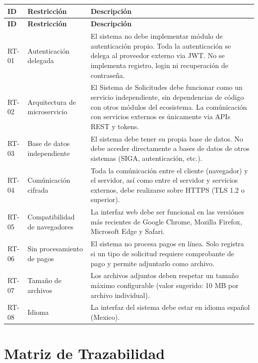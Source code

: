 \begin{longtable}{|C{1cm}|L{4cm}|L{8.5cm}|}
    \hline
    \textbf{ID} & \textbf{Restricción} & \textbf{Descripción} \\
    \hline
    \endfirsthead
    \hline
    \textbf{ID} & \textbf{Restricción} & \textbf{Descripción} \\
    \hline
    \endhead
    \hline
    \endfoot

    RT-01 & Autenticación delegada & El sistema no debe implementar módulo de autenticación propio. Toda la autenticación se delega al proveedor externo via JWT. No se implementa registro, login ni recuperación de contraseña. \\
    \hline
    RT-02 & Arquitectura de microservicio & El Sistema de Solicitudes debe funcionar como un servicio independiente, sin dependencias de código con otros módulos del ecosistema. La comúnicación con servicios externos es únicamente via APIs REST y tokens. \\
    \hline
    RT-03 & Base de datos independiente & El sistema debe tener su propia base de datos. No debe acceder directamente a bases de datos de otros sistemas (SIGA, autenticación, etc.). \\
    \hline
    RT-04 & Comúnicación cifrada & Toda la comúnicación entre el cliente (navegador) y el servidor, así como entre el servidor y servicios externos, debe realizarse sobre HTTPS (TLS 1.2 o superior). \\
    \hline
    RT-05 & Compatibilidad de navegadores & La interfaz web debe ser funcional en las versiónes más recientes de Google Chrome, Mozilla Firefox, Microsoft Edge y Safari. \\
    \hline
    RT-06 & Sin procesamiento de pagos & El sistema no procesa pagos en línea. Solo registra si un tipo de solicitud requiere comprobante de pago y permite adjuntarlo como archivo. \\
    \hline
    RT-07 & Tamaño de archivos & Los archivos adjuntos deben respetar un tamaño máximo configurable (valor sugerido: 10 MB por archivo individual). \\
    \hline
    RT-08 & Idioma & La interfaz del sistema debe estar en idioma español (Mexico). \\
    \hline
\end{longtable}

\section{Matriz de Trazabilidad}


